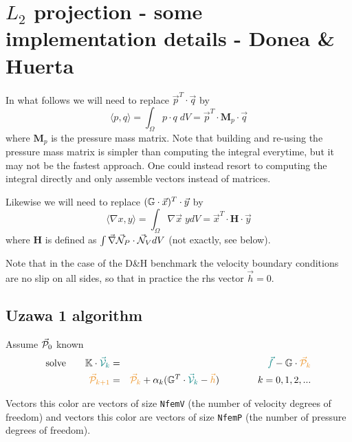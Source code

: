 










\newpage
\section*{$L_2$ projection - some implementation details - Donea \& Huerta}

In what follows we will need to replace $\vec{p}^T\cdot\vec{q}$ 
by 
\[
\langle p,q \rangle = \int_\Omega {p} \cdot {q} \; dV 
= \vec{p}^T \cdot {\bm M}_{p} \cdot \vec{q}
\]
where ${\bm M}_{p}$ is the pressure mass matrix. 
Note that building and re-using the pressure mass matrix is simpler than 
computing the integral everytime, but it may not be 
the fastest approach. One could instead resort to computing the integral directly
and only assemble vectors instead of matrices. 

Likewise we will need to replace $( {\mathbb{G}} \cdot \vec{x})^T\cdot \vec{y}$
by
\[
\langle \nabla {x},{y} \rangle = \int_\Omega \nabla \vec{x} \; {y} dV = \vec{x}^T \cdot {\bm H} \cdot \vec{y}
\]
where ${\bm H}$ is defined as $\int \vec\nabla \vec{{\mathcal{N}}}_P  \cdot \vec{{\mathcal{N}}}_V dV$ (not exactly, see below). 

Note that in the case of the D\&H benchmark the velocity boundary conditions
are no slip on all sides, so that in practice the rhs vector $\vec{h}=0$.

\subsection*{Uzawa 1 algorithm}

Assume $\vec{\cal P}_0$ known
\begin{eqnarray}
\text{solve} \qquad \mathbb{K} \cdot {\color{teal} \vec{\cal V}_k} 
&=& {\color{teal} \vec{f}} - \mathbb{G}\cdot {\color{carrotorange} \vec{\cal P}_{k}}  \nn\\
{\color{carrotorange} \vec{\cal P}_{k+1}} &=& 
{\color{carrotorange} \vec{\cal P}_{k}}  
+ \alpha_k (\mathbb{G}^T\cdot {\color{teal} \vec{\cal V}_k}   - {\color{carrotorange}\vec{h}})
\quad
\quad
\quad
\quad
k=0,1,2, ... 
\end{eqnarray}

Vectors this {\color{teal} color} are vectors of size \lstinline{NfemV} (the number 
of velocity degrees of freedom) and vectors this {\color{carrotorange} color} are 
vectors of size \lstinline{NfemP} (the number of pressure degrees of freedom).

